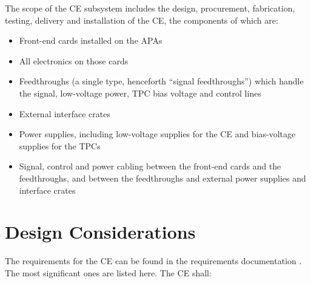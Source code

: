 The scope of the CE subsystem includes the design, procurement, fabrication, testing,
delivery and installation of the CE, the components of which are:
\begin{itemize}
\item Front-end cards installed on the APAs
\item All electronics on those cards
\item Feedthroughs (a single type, henceforth ``signal feedthroughs'') which handle the signal,
low-voltage power, TPC bias voltage and control lines
\item External interface crates
\item Power supplies, including low-voltage supplies for the CE and bias-voltage supplies for the TPCs
\item Signal, control and power cabling between the front-end cards and the feedthroughs,
and between the feedthroughs and external power supplies and interface crates
\end{itemize}

%
\section{Design Considerations} 
\label{sec:ce_reqs_n_specs}

The requirements for the CE can be found in the requirements documentation \cite{lar-fd-req}.
The most significant ones are listed here. The CE shall:

